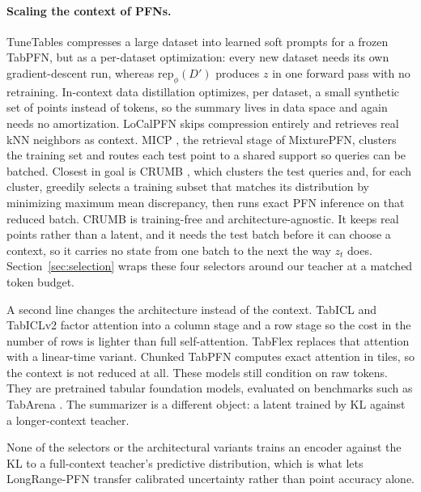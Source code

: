\documentclass{article}
\newcommand{\Dfar}{D'}
\newcommand{\rep}{\mathrm{rep}}
\begin{document}
\paragraph{Scaling the context of PFNs.} TuneTables \citep{feuer2024tunetables}
compresses a large dataset into learned soft prompts for a frozen TabPFN,
but as a per-dataset optimization: every new dataset needs its own
gradient-descent run, whereas $\rep_\phi(\Dfar)$ produces $z$ in one forward
pass with no retraining. In-context data distillation \citep{ma2024icd}
optimizes, per dataset, a small synthetic set of points instead of tokens,
so the summary lives in data space and again needs no amortization.
LoCalPFN \citep{thomas2024localpfn} skips compression entirely and
retrieves real kNN neighbors as context. MICP \citep{xu2024micp}, the
retrieval stage of MixturePFN, clusters the training set and routes each
test point to a shared support so queries can be batched. Closest in goal
is CRUMB \citep{heredge2026crumb}, which clusters the test queries and, for
each cluster, greedily selects a training subset that matches its
distribution by minimizing maximum mean discrepancy, then runs exact PFN
inference on that reduced batch. CRUMB is training-free and
architecture-agnostic. It keeps real points rather than a latent, and it
needs the test batch before it can choose a context, so it carries no
state from one batch to the next the way $z_t$ does. Section~\ref{sec:selection}
wraps these four selectors around our teacher at a matched token budget.

A second line changes the architecture instead of the context.
TabICL and TabICLv2 \citep{qu2025tabicl, qu2026tabiclv2} factor attention
into a column stage and a row stage so the cost in the number of rows is
lighter than full self-attention. TabFlex \citep{zeng2025tabflex} replaces
that attention with a linear-time variant. Chunked TabPFN
\citep{sergazinov2025chunked} computes exact attention in tiles, so the
context is not reduced at all. These models still condition on raw tokens.
They are pretrained tabular foundation models, evaluated on benchmarks such
as TabArena \citep{erickson2025tabarena}. The summarizer is a different
object: a latent trained by KL against a longer-context teacher.

None of the selectors or the architectural variants trains an encoder
against the KL to a full-context teacher's predictive distribution, which
is what lets LongRange-PFN transfer calibrated uncertainty rather than
point accuracy alone.
\end{document}
